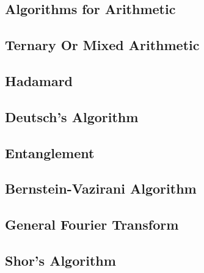 \documentclass[]{article}
\begin{document}
\subsection{Algorithms for Arithmetic}
\subsection{Ternary Or Mixed Arithmetic}

\subsection{Hadamard}
\subsection{Deutsch's Algorithm}

\subsection{Entanglement}
\subsection{Bernstein-Vazirani Algorithm}

\subsection{General Fourier Transform}
\subsection{Shor's Algorithm}
\end{document}
